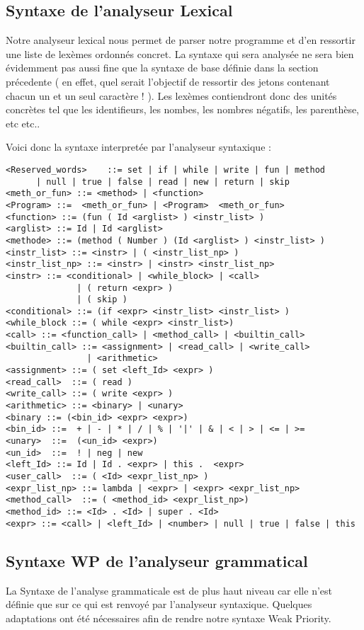 \subsection{Syntaxe de l'analyseur Lexical}

Notre analyseur lexical nous permet de parser notre programme et d'en ressortir une liste de lexèmes ordonnés concret. 
La syntaxe qui sera analysée ne sera bien évidemment pas aussi fine que la syntaxe de base définie dans la section précedente 
( en effet, quel serait l'objectif de ressortir des jetons contenant chacun un et un seul caractère ! ). 
Les lexèmes contiendront donc des unités concrètes tel que les identifieurs, les nombes, les nombres négatifs, les parenthèse, etc etc..

Voici donc la syntaxe interpretée par l'analyseur syntaxique :

\begin{verbatim}
<Reserved_words>    ::= set | if | while | write | fun | method 
      | null | true | false | read | new | return | skip
<meth_or_fun> ::= <method> | <function>
<Program> ::=  <meth_or_fun> | <Program>  <meth_or_fun>
<function> ::= (fun ( Id <arglist> ) <instr_list> ) 
<arglist> ::= Id | Id <arglist>
<methode> ::= (method ( Number ) (Id <arglist> ) <instr_list> )
<instr_list> ::= <instr> | ( <instr_list_np> ) 
<instr_list_np> ::= <instr> | <instr> <instr_list_np>
<instr> ::= <conditional> | <while_block> | <call> 
			  | ( return <expr> ) 
			  | ( skip )
<conditional> ::= (if <expr> <instr_list> <instr_list> ) 
<while_block ::= ( while <expr> <instr_list>) 
<call> ::= <function_call> | <method_call> | <builtin_call> 
<builtin_call> ::= <assignment> | <read_call> | <write_call> 
                | <arithmetic>
<assignment> ::= ( set <left_Id> <expr> ) 
<read_call>  ::= ( read ) 
<write_call> ::= ( write <expr> )
<arithmetic> ::= <binary> | <unary>
<binary ::= (<bin_id> <expr> <expr>)
<bin_id> ::=  + | - | * | / | % | '|' | & | < | > | <= | >=
<unary>  ::=  (<un_id> <expr>)
<un_id>  ::=  ! | neg | new
<left_Id> ::= Id | Id . <expr> | this .  <expr>
<user_call>  ::= ( <Id> <expr_list_np> )
<expr_list_np> ::= lambda | <expr> | <expr> <expr_list_np>
<method_call>  ::= ( <method_id> <expr_list_np>)
<method_id> ::= <Id> . <Id> | super . <Id> 
<expr> ::= <call> | <left_Id> | <number> | null | true | false | this  
\end{verbatim}


\subsection{Syntaxe WP de l'analyseur grammatical}
La Syntaxe de l'analyse grammaticale est de plus haut niveau car elle n'est définie que sur ce qui
est renvoyé par l'analyseur syntaxique. Quelques adaptations ont été nécessaires afin de rendre
notre syntaxe Weak Priority. 

